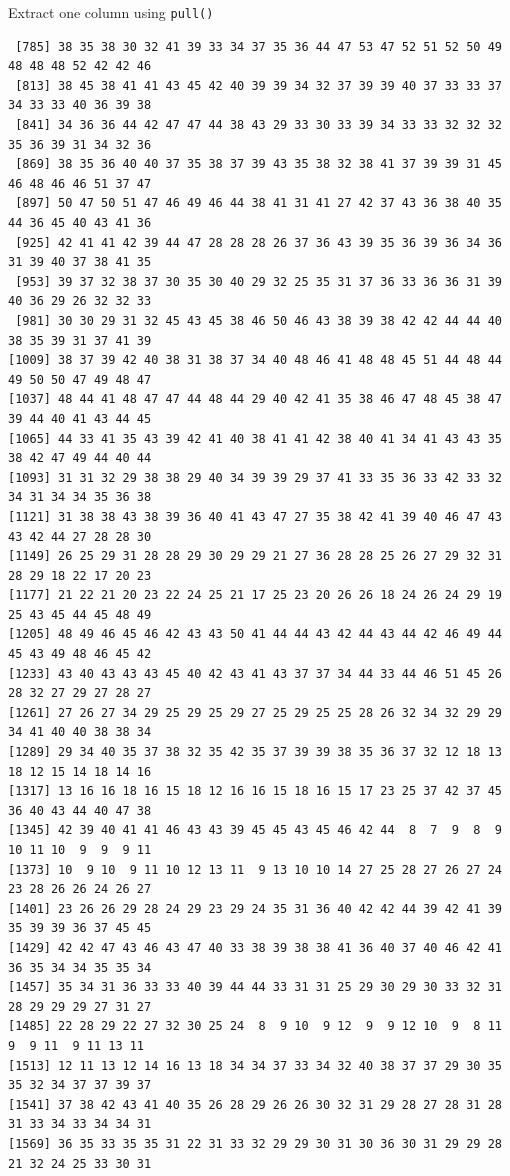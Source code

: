 \documentclass[
  ignorenonframetext,
  aspectratio=169,
]{beamer}
\let\oldtexttt\texttt
\renewcommand{\texttt}[1]{\colorbox{gray!20}{\oldtexttt{#1}}}
\begin{document}
\begin{frame}[fragile]{Extract one column using \texttt{pull()}}
\begin{verbatim}
 [785] 38 35 38 30 32 41 39 33 34 37 35 36 44 47 53 47 52 51 52 50 49 48 48 48 52 42 42 46
 [813] 38 45 38 41 41 43 45 42 40 39 39 34 32 37 39 39 40 37 33 33 37 34 33 33 40 36 39 38
 [841] 34 36 36 44 42 47 47 44 38 43 29 33 30 33 39 34 33 33 32 32 32 35 36 39 31 34 32 36
 [869] 38 35 36 40 40 37 35 38 37 39 43 35 38 32 38 41 37 39 39 31 45 46 48 46 46 51 37 47
 [897] 50 47 50 51 47 46 49 46 44 38 41 31 41 27 42 37 43 36 38 40 35 44 36 45 40 43 41 36
 [925] 42 41 41 42 39 44 47 28 28 28 26 37 36 43 39 35 36 39 36 34 36 31 39 40 37 38 41 35
 [953] 39 37 32 38 37 30 35 30 40 29 32 25 35 31 37 36 33 36 36 31 39 40 36 29 26 32 32 33
 [981] 30 30 29 31 32 45 43 45 38 46 50 46 43 38 39 38 42 42 44 44 40 38 35 39 31 37 41 39
[1009] 38 37 39 42 40 38 31 38 37 34 40 48 46 41 48 48 45 51 44 48 44 49 50 50 47 49 48 47
[1037] 48 44 41 48 47 47 44 48 44 29 40 42 41 35 38 46 47 48 45 38 47 39 44 40 41 43 44 45
[1065] 44 33 41 35 43 39 42 41 40 38 41 41 42 38 40 41 34 41 43 43 35 38 42 47 49 44 40 44
[1093] 31 31 32 29 38 38 29 40 34 39 39 29 37 41 33 35 36 33 42 33 32 34 31 34 34 35 36 38
[1121] 31 38 38 43 38 39 36 40 41 43 47 27 35 38 42 41 39 40 46 47 43 43 42 44 27 28 28 30
[1149] 26 25 29 31 28 28 29 30 29 29 21 27 36 28 28 25 26 27 29 32 31 28 29 18 22 17 20 23
[1177] 21 22 21 20 23 22 24 25 21 17 25 23 20 26 26 18 24 26 24 29 19 25 43 45 44 45 48 49
[1205] 48 49 46 45 46 42 43 43 50 41 44 44 43 42 44 43 44 42 46 49 44 45 43 49 48 46 45 42
[1233] 43 40 43 43 43 45 40 42 43 41 43 37 37 34 44 33 44 46 51 45 26 28 32 27 29 27 28 27
[1261] 27 26 27 34 29 25 29 25 29 27 25 29 25 25 28 26 32 34 32 29 29 34 41 40 40 38 38 34
[1289] 29 34 40 35 37 38 32 35 42 35 37 39 39 38 35 36 37 32 12 18 13 18 12 15 14 18 14 16
[1317] 13 16 16 18 16 15 18 12 16 16 15 18 16 15 17 23 25 37 42 37 45 36 40 43 44 40 47 38
[1345] 42 39 40 41 41 46 43 43 39 45 45 43 45 46 42 44  8  7  9  8  9 10 11 10  9  9  9 11
[1373] 10  9 10  9 11 10 12 13 11  9 13 10 10 14 27 25 28 27 26 27 24 23 28 26 26 24 26 27
[1401] 23 26 26 29 28 24 29 23 29 24 35 31 36 40 42 42 44 39 42 41 39 35 39 39 36 37 45 45
[1429] 42 42 47 43 46 43 47 40 33 38 39 38 38 41 36 40 37 40 46 42 41 36 35 34 34 35 35 34
[1457] 35 34 31 36 33 33 40 39 44 44 33 31 31 25 29 30 29 30 33 32 31 28 29 29 29 27 31 27
[1485] 22 28 29 22 27 32 30 25 24  8  9 10  9 12  9  9 12 10  9  8 11  9  9 11  9 11 13 11
[1513] 12 11 13 12 14 16 13 18 34 34 37 33 34 32 40 38 37 37 29 30 35 35 32 34 37 37 39 37
[1541] 37 38 42 43 41 40 35 26 28 29 26 26 30 32 31 29 28 27 28 31 28 31 33 34 33 34 34 31
[1569] 36 35 33 35 35 31 22 31 33 32 29 29 30 31 30 36 30 31 29 29 28 21 32 24 25 33 30 31

\end{verbatim}
\end{frame}
\end{document}
